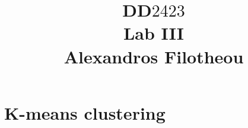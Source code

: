 \documentclass[oneside,12pt]{article}
\title{DD$2423$ \\ Lab III \\ Alexandros Filotheou}
\date{}
\begin{document}
	\maketitle

  \section{K-means clustering}
  
\end{document}
